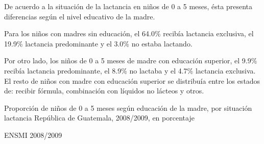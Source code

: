 
%
{%
De acuerdo a la situación de la lactancia en niños de 0 a 5 meses, ésta presenta diferencias según el nivel educativo de la madre.

Para los niños con madres sin educación, el 64.0\% recibía lactancia exclusiva, el 19.9\% lactancia predominante y el 3.0\% no estaba lactando. 

Por otro lado, los niños de 0 a 5 meses de madre con educación superior, el 9.9\% recibía lactancia predominante, el 8.9\% no lactaba y el 4.7\% lactancia exclusiva. El resto de niños con madre con educación superior se distribuía entre los estados de: recibir fórmula, combinación con líquidos no lácteos y otros.}%
{%
	Proporción de niños de 0 a 5 meses según educación de la madre, por situación lactancia
} %
{%
	República de Guatemala, 2008/2009, en porcentaje} %
{%
	\begin{tikzpicture}[x=1pt,y=1pt]    \end{tikzpicture}
}%
{%
	ENSMI 2008/2009} %